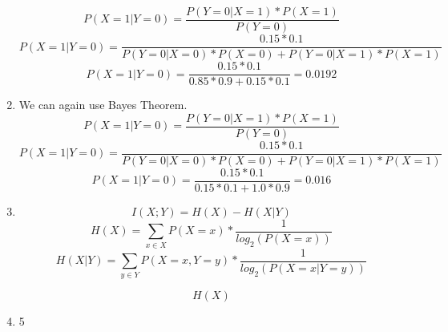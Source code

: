 \documentclass{article}
\begin{document}
\begin{enumerate}
	      \[P(X = 1 | Y = 0) = \frac{P(Y = 0 | X = 1) * P(X = 1)}{P(Y = 0)}\]
	      \[P(X = 1 | Y = 0) = \frac{0.15 * 0.1}{P(Y = 0 | X = 0)* P(X = 0) + P(Y = 0 | X = 1) * P(X = 1)}\]
	      \[P(X = 1 | Y = 0) = \frac{0.15 * 0.1}{0.85 * 0.9 + 0.15 * 0.1} = 0.0192\]
	\item We can again use Bayes Theorem.
	      \[P(X = 1 | Y = 0) = \frac{P(Y = 0 | X = 1) * P(X = 1)}{P(Y = 0)}\]
	      \[P(X = 1 | Y = 0) = \frac{0.15 * 0.1}{P(Y = 0 | X = 0)* P(X = 0) + P(Y = 0 | X = 1) * P(X = 1)}\]
	      \[P(X = 1 | Y = 0) = \frac{0.15 * 0.1}{0.15 * 0.1 + 1.0 * 0.9} = 0.016\]
	\item
	      \[I(X; Y) = H(X) - H(X | Y)\]
	      \[H(X) = \sum_{x \in X} P(X = x) * \frac{1}{log_2(P(X = x))}\]
	      \[H(X | Y) = \sum_{y \in Y} P(X = x, Y = y) * \frac{1}{log_2(P(X = x | Y = y))}\]

	      \[H(X)\]
	\item 5

\end{enumerate}


\nocite{*}
\end{document}
